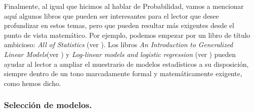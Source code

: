 Finalmente, al igual que hicimos al hablar de Probabilidad, vamos a mencionar aquí algunos libros que pueden ser interesantes para el lector que desee profundizar en estos temas, pero que pueden resultar más exigentes desde el punto de vista matemático. Por ejemplo, podemos empezar por un libro de título ambicioso: {\em All of Statistics} (ver \cite{wasserman2013all}). Los libros {\em An Introduction to Generalized Linear Models}(ver \cite{dobson2011introduction})  y {\em Log-linear models and logistic regression} (ver \cite{christensen2006log}) pueden ayudar al lector a ampliar el muestrario de modelos estadísticos a su disposición, siempre dentro de un tono marcadamente formal y matemáticamente exigente, como hemos dicho.

\subsubsection{Selección de modelos.}

